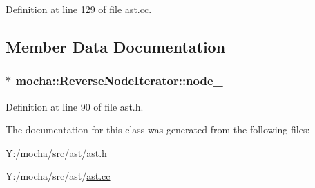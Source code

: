 Definition at line 129 of file ast.cc.



\subsection{Member Data Documentation}
\hypertarget{classmocha_1_1_reverse_node_iterator_a84873356a6ecaf89e595e85efd514dd3}{
\subsubsection[{node\_\-}]{$\ast$ {\bf mocha::ReverseNodeIterator::node\_\-}}}
\label{classmocha_1_1_reverse_node_iterator_a84873356a6ecaf89e595e85efd514dd3}


Definition at line 90 of file ast.h.



The documentation for this class was generated from the following files:\begin{DoxyCompactItemize}
\item 
Y:/mocha/src/ast/\hyperlink{ast_8h}{ast.h}\item 
Y:/mocha/src/ast/\hyperlink{ast_8cc}{ast.cc}\end{DoxyCompactItemize}
